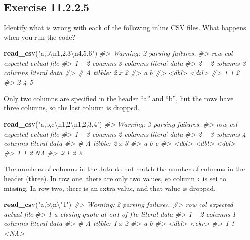 \documentclass[]{book}
\newenvironment{Shaded}{\begin{snugshade}}{\end{snugshade}}
\newcommand{\CharTok}[1]{\textcolor[rgb]{0.31,0.60,0.02}{#1}}
\newcommand{\CommentTok}[1]{\textcolor[rgb]{0.56,0.35,0.01}{\textit{#1}}}
\newcommand{\KeywordTok}[1]{\textcolor[rgb]{0.13,0.29,0.53}{\textbf{#1}}}
\newcommand{\NormalTok}[1]{#1}
\newcommand{\StringTok}[1]{\textcolor[rgb]{0.31,0.60,0.02}{#1}}
\theoremstyle{plain}
\theoremstyle{remark}
\begin{document}
\hypertarget{exercise-11.2.2.5}{%
\subsection*{\texorpdfstring{Exercise {11.2.2.5}}{Exercise 11.2.2.5}}\label{exercise-11.2.2.5}}

Identify what is wrong with each of the following inline CSV files.
What happens when you run the code?

\begin{Shaded}
\begin{Highlighting}[]
\KeywordTok{read_csv}\NormalTok{(}\StringTok{"a,b}\CharTok{\textbackslash{}n}\StringTok{1,2,3}\CharTok{\textbackslash{}n}\StringTok{4,5,6"}\NormalTok{)}
\CommentTok{#> Warning: 2 parsing failures.}
\CommentTok{#> row col  expected    actual         file}
\CommentTok{#>   1  -- 2 columns 3 columns literal data}
\CommentTok{#>   2  -- 2 columns 3 columns literal data}
\CommentTok{#> # A tibble: 2 x 2}
\CommentTok{#>       a     b}
\CommentTok{#>   <dbl> <dbl>}
\CommentTok{#> 1     1     2}
\CommentTok{#> 2     4     5}
\end{Highlighting}
\end{Shaded}

Only two columns are specified in the header ``a'' and ``b'', but the rows have three columns, so the last column is dropped.

\begin{Shaded}
\begin{Highlighting}[]
\KeywordTok{read_csv}\NormalTok{(}\StringTok{"a,b,c}\CharTok{\textbackslash{}n}\StringTok{1,2}\CharTok{\textbackslash{}n}\StringTok{1,2,3,4"}\NormalTok{)}
\CommentTok{#> Warning: 2 parsing failures.}
\CommentTok{#> row col  expected    actual         file}
\CommentTok{#>   1  -- 3 columns 2 columns literal data}
\CommentTok{#>   2  -- 3 columns 4 columns literal data}
\CommentTok{#> # A tibble: 2 x 3}
\CommentTok{#>       a     b     c}
\CommentTok{#>   <dbl> <dbl> <dbl>}
\CommentTok{#> 1     1     2    NA}
\CommentTok{#> 2     1     2     3}
\end{Highlighting}
\end{Shaded}

The numbers of columns in the data do not match the number of columns in the header (three).
In row one, there are only two values, so column \texttt{c} is set to missing.
In row two, there is an extra value, and that value is dropped.

\begin{Shaded}
\begin{Highlighting}[]
\KeywordTok{read_csv}\NormalTok{(}\StringTok{"a,b}\CharTok{\textbackslash{}n\textbackslash{}"}\StringTok{1"}\NormalTok{)}
\CommentTok{#> Warning: 2 parsing failures.}
\CommentTok{#> row col                     expected    actual         file}
\CommentTok{#>   1  a  closing quote at end of file           literal data}
\CommentTok{#>   1  -- 2 columns                    1 columns literal data}
\CommentTok{#> # A tibble: 1 x 2}
\CommentTok{#>       a b    }
\CommentTok{#>   <dbl> <chr>}
\CommentTok{#> 1     1 <NA>}
\end{Highlighting}
\end{Shaded}
\end{document}
